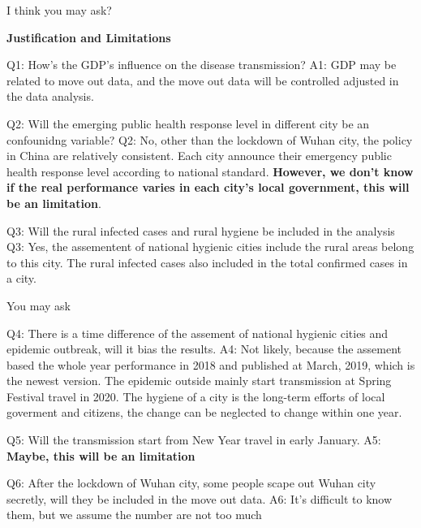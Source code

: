\documentclass[10pt,ignorenonframetext,aspectratio=169,notes=hide,]{beamer}
\begin{document}
\begin{frame}{I think you may ask?}
\protect\hypertarget{i-think-you-may-ask}{}

\textbf{Justification and Limitations}

Q1: How's the GDP's influence on the disease transmission?
A1: GDP may be related to move out data, and the move out data will be controlled adjusted in the data analysis.

Q2: Will the emerging public health response level in different city be an confounidng variable?
Q2: No, other than the lockdown of Wuhan city, the policy in China are relatively consistent. Each city announce their emergency public health response level according to national standard. \textbf{However, we don't know if the real performance varies in each city's local government, this will be an limitation}.

Q3: Will the rural infected cases and rural hygiene be included in the analysis
Q3: Yes, the assementent of national hygienic cities include the rural areas belong to this city. The rural infected cases also included in the total confirmed cases in a city.

\end{frame}

\begin{frame}{You may ask}
\protect\hypertarget{you-may-ask}{}

Q4: There is a time difference of the assement of national hygienic cities and epidemic outbreak, will it bias the results.
A4: Not likely, because the assement based the whole year performance in 2018 and published at March, 2019, which is the newest version. The epidemic outside mainly start transmission at Spring Festival travel in 2020. The hygiene of a city is the long-term efforts of local goverment and citizens, the change can be neglected to change within one year.

Q5: Will the transmission start from New Year travel in early January.
A5: \textbf{Maybe, this will be an limitation}

Q6: After the lockdown of Wuhan city, some people scape out Wuhan city secretly, will they be included in the move out data.
A6: It's difficult to know them, but we assume the number are not too much

\end{frame}
\end{document}

